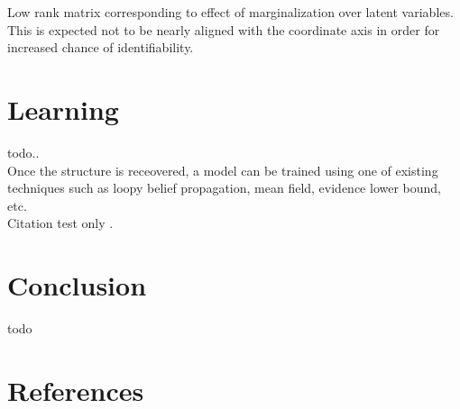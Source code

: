 \documentclass[10pt,conference]{IEEEtran}
\begin{document}
Low rank matrix corresponding to effect of marginalization over latent variables. This is expected not to be nearly aligned with the coordinate axis in order for increased chance of identifiability.\\

\section*{Learning}
todo..\\
Once the structure is receovered, a model can be trained using one of existing techniques such as loopy belief propagation, mean field, evidence lower bound, etc.\\

Citation test only \cite{Chandra_1}.

\vfill\null

\pagebreak

\section*{Conclusion}
todo
\vfill\null

\pagebreak

\section*{References}
\printbibliography[heading=none]
\end{document}

